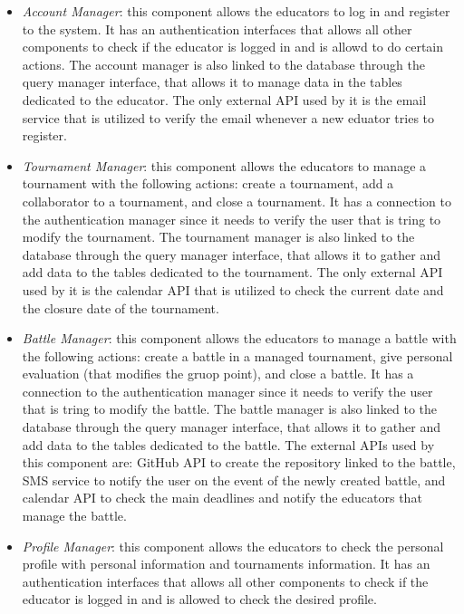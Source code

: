 \documentclass[12pt, a4paper]{report}
\begin{document}
    \begin{itemize}
        \item \textit{Account Manager}: this component allows the educators to log in and register to the system.
            It has an authentication interfaces that allows all other components to check if the educator is logged in and is allowd to do certain actions. 
            The account manager is also linked to the database through the query manager interface, that allows it to manage data in the tables dedicated to the educator.
            The only external API used by it is the email service that is utilized to verify the email whenever a new eduator tries to register. 
        \item \textit{Tournament Manager}: this component allows the educators to manage a tournament with the following actions: create a tournament, add a collaborator to a tournament, and close a tournament. 
            It has a connection to the authentication manager since it needs to verify the user that is tring to modify the tournament. 
            The tournament manager is also linked to the database through the query manager interface, that allows it to gather and add data to the tables dedicated to the tournament.
            The only external API used by it is the calendar API that is utilized to check the current date and the closure date of the tournament.
        \item \textit{Battle Manager}: this component allows the educators to manage a battle with the following actions: create a battle in a managed tournament, give personal evaluation (that modifies the gruop point), and close a battle. 
            It has a connection to the authentication manager since it needs to verify the user that is tring to modify the battle. 
            The battle manager is also linked to the database through the query manager interface, that allows it to gather and add data to the tables dedicated to the battle.
            The external APIs used by this component are: GitHub API to create the repository linked to the battle, SMS service to notify the user on the event of the newly created battle, and calendar API to check the main deadlines and notify the educators that manage the battle.
        \item \textit{Profile Manager}: this component allows the educators to check the personal profile with personal information and tournaments information. 
            It has an authentication interfaces that allows all other components to check if the educator is logged in and is allowed to check the desired profile. 

\end{itemize}
\end{document}
